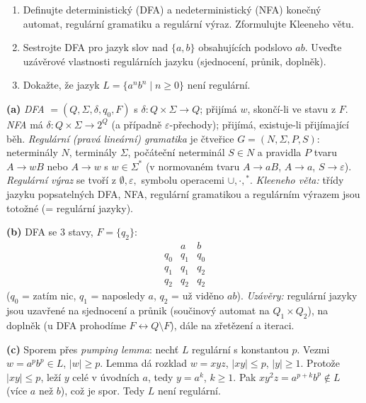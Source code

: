\begin{zadani}
\begin{enumerate}[label=(\alph*)]
  \item {} Definujte deterministický (DFA) a nedeterministický (NFA) konečný automat, regulární gramatiku a regulární výraz. Zformulujte Kleeneho větu.
  \item {} Sestrojte DFA pro jazyk slov nad $\{a,b\}$ obsahujících podslovo $ab$. Uveďte uzávěrové vlastnosti regulárních jazyku (sjednocení, průnik, doplněk).
  \item {} Dokažte, že jazyk $L=\{a^n b^n\mid n\ge0\}$ není regulární.
\end{enumerate}
\end{zadani}

\begin{reseni}
\textbf{(a)} \emph{DFA} $=(Q,\Sigma,\delta,q_0,F)$ s $\delta:Q\times\Sigma\to Q$; přijímá $w$, skončí-li ve stavu z $F$. \emph{NFA} má $\delta:Q\times\Sigma\to 2^Q$ (a případně $\varepsilon$-přechody); přijímá, existuje-li přijímající běh. \emph{Regulární (pravá lineární) gramatika} je čtveřice $G=(N,\Sigma,P,S)$: neterminály $N$, terminály $\Sigma$, počáteční neterminál $S\in N$ a pravidla $P$ tvaru $A\to wB$ nebo $A\to w$ s $w\in\Sigma^*$ (v normovaném tvaru $A\to aB$, $A\to a$, $S\to\varepsilon$). \emph{Regulární výraz} se tvoří z $\emptyset,\varepsilon,$ symbolu operacemi $\cup,\cdot,{}^*$. \emph{Kleeneho věta:} třídy jazyku popsatelných DFA, NFA, regulární gramatikou a regulárním výrazem jsou totožné (= regulární jazyky).

\textbf{(b)} DFA se 3 stavy, $F=\{q_2\}$:
\[
\begin{array}{c|cc}
 & a & b\\\hline
q_0 & q_1 & q_0\\
q_1 & q_1 & q_2\\
q_2 & q_2 & q_2
\end{array}
\]
($q_0$ = zatím nic, $q_1$ = naposledy $a$, $q_2$ = už viděno $ab$). \emph{Uzávěry:} regulární jazyky jsou uzavřené na sjednocení a průnik (součinový automat na $Q_1\times Q_2$), na doplněk (u DFA prohodíme $F\leftrightarrow Q\setminus F$), dále na zřetězení a iteraci.

\textbf{(c)} Sporem přes \emph{pumping lemma}: nechť $L$ regulární s konstantou $p$. Vezmi $w=a^p b^p\in L$, $|w|\ge p$. Lemma dá rozklad $w=xyz$, $|xy|\le p$, $|y|\ge1$. Protože $|xy|\le p$, leží $y$ celé v úvodních $a$, tedy $y=a^k$, $k\ge1$. Pak $xy^2z=a^{p+k}b^p\notin L$ (více $a$ než $b$), což je spor. Tedy $L$ není regulární.
\end{reseni}


